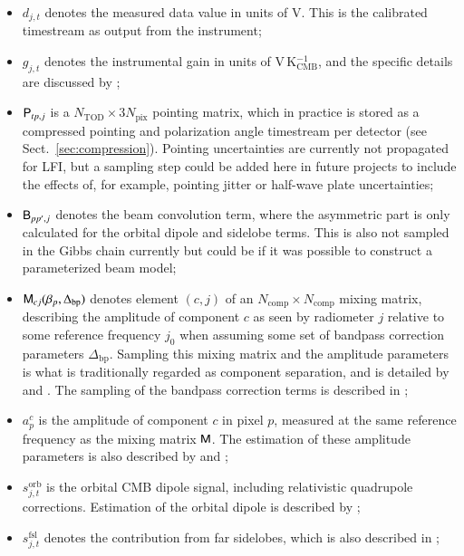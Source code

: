 \documentclass[twocolumn]{aa}
\newcommand{\B}[0]{\tens{B}}
\newcommand{\M}[0]{\tens{M}}
\renewcommand{\P}[0]{\tens{P}}
\newcommand{\Dbp}[0]{\Delta_{\mathrm{bp}}}
\begin{document}
\begin{itemize}
\item $d_{j,t}$ denotes the measured data value in units of V. This is the calibrated timestream as output from the instrument;

\item $g_{j,t}$ denotes the instrumental gain in units of V\,K$_{\mathrm{CMB}}^{-1}$, and the specific details are discussed by \citet{BP07};

\item $\P_{tp,j}$ is a $N_{\mathrm{TOD}}\times 3N_{\mathrm{pix}}$
  pointing matrix, which in practice is stored as a compressed
  pointing and polarization angle timestream per detector (see Sect.~\ref{sec:compression}). Pointing uncertainties are currently not propagated for LFI, but a sampling
  step could be added here in future projects to include the effects
  of, for example, pointing jitter or half-wave plate uncertainties;
  
\item $\B_{pp',j}$ denotes the beam convolution term, where the asymmetric part is only calculated for the orbital dipole and sidelobe terms. This is also not sampled in the Gibbs chain currently but could be if it was possible to construct a parameterized beam model;

\item $\M_{cj}(\beta_{p}, \Dbp)$ denotes element $(c,j)$ of an
  $N_{\mathrm{comp}}\times N_{\mathrm{comp}}$ mixing matrix, describing the amplitude of component $c$ as
  seen by radiometer $j$ relative to some reference frequency $j_0$
  when assuming some set of bandpass correction parameters $\Dbp$. Sampling this mixing matrix and the amplitude parameters is what is traditionally regarded as component separation, and is detailed by \citet{BP13} and \citet{BP14}. The sampling of the bandpass correction terms is described in \citet{BP09};
  
\item $a^c_{p}$ is the amplitude of component $c$ in pixel $p$,
  measured at the same reference frequency as the mixing matrix $\M$. The estimation of these amplitude parameters is also described by \citet{BP13} and \citet{BP14};
  
\item $s^{\mathrm{orb}}_{j,t}$ is the orbital CMB dipole signal, including relativistic quadrupole corrections. Estimation of the orbital dipole is described by \citet{BP08};
  
\item $s^{\mathrm{fsl}}_{j,t}$ denotes the contribution from far sidelobes, which is also described in \citet{BP08};


\end{itemize}
\end{document}
